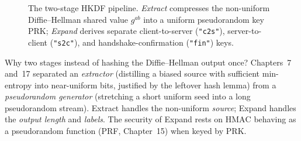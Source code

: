 \begin{figure}[htbp]
\caption{The two-stage HKDF pipeline. \emph{Extract} compresses the non-uniform Diffie--Hellman shared value $g^{ab}$ into a uniform pseudorandom key $\mathrm{PRK}$; \emph{Expand} derives separate client-to-server (\texttt{"c2s"}), server-to-client (\texttt{"s2c"}), and handshake-confirmation (\texttt{"fin"}) keys.}
\label{ch23:fig-hkdf}
\end{figure}

\begin{connectionbox}
Why two stages instead of hashing the Diffie--Hellman output once? Chapters~7
and~17 separated an \emph{extractor} (distilling a biased source with sufficient
min-entropy into near-uniform bits, justified by the leftover hash lemma) from a
\emph{pseudorandom generator} (stretching a short uniform seed into a long
pseudorandom stream). Extract handles the non-uniform \emph{source}; Expand
handles the \emph{output length} and \emph{labels}. The security of Expand rests
on $\mathrm{HMAC}$ behaving as a pseudorandom function (PRF, Chapter~15) when
keyed by $\mathrm{PRK}$.
\end{connectionbox}

